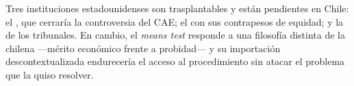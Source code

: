 \begin{foco}
Tres instituciones estadounidenses son trasplantables y están pendientes en Chile: el
, que cerraría la controversia del CAE; el
 con sus contrapesos de equidad; y la
 de los tribunales. En cambio, el \emph{means test} responde a
una filosofía distinta de la chilena ---mérito económico frente a probidad--- y su importación
descontextualizada endurecería el acceso al procedimiento sin atacar el problema que la \Lreforma{}
quiso resolver.
\end{foco}
